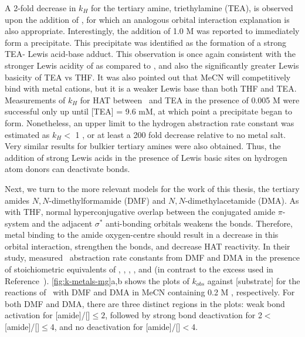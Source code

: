 \begin{doublespace}
A 2-fold decrease in $k_H$ for the tertiary amine, triethylamine (TEA), is
observed upon the addition of , for which an analogous orbital
interaction explanation is also appropriate. Interestingly, the addition of 1.0
M  was reported to immediately form a precipitate. This
precipitate was identified as the formation of a strong TEA- Lewis
acid-base adduct. This observation is once again consistent with the stronger
Lewis acidity of  as compared to , and also the
significantly greater Lewis basicity of TEA vs THF.\cite{Salamone2013a,
Reichardt2010} It was also pointed out that MeCN will competitively bind with
metal cations, but it is a weaker Lewis base than both THF and TEA.
Measurements of $k_H$ for HAT between \cumo\ and TEA in the presence of 0.005 M
 were successful only up until [TEA] = 9.6 mM, at which point a
precipitate began to form. Nonetheless, an upper limit to the hydrogen
abstraction rate constant was estimated as $k_H <$ 1 \Ms, or at least a 200
fold decrease relative to no metal salt. Very similar results for bulkier
tertiary amines were also obtained. Thus, the addition of strong Lewis acids in
the presence of Lewis basic sites on hydrogen atom donors can deactivate
 bonds.

Next, we turn to the more relevant models for the work of this thesis, the
tertiary amides $N,N$-dimethylformamide (DMF) and $N,N$-dimethylacetamide (DMA).
As with THF, normal hyperconjugative overlap between the conjugated amide
$\pi$-system and the adjacent  $\sigma^*$ anti-bonding orbitals weakens
the  bonds. Therefore, metal binding to the amide oxygen-centre should
result in a decrease in this orbital interaction, strengthen the  bonds,
and decrease HAT reactivity. In their study, \citet{Salamone2015metals} measured
\cumo\ abstraction rate constants from DMF and DMA in the presence of
stoichiometric equivalents of , , ,
, and  (in contrast to the excess used in
Reference~). \ref{fig:k-metals-mg}a,b shows the plots of
$k_{obs}$ against [substrate] for the reactions of \cumo\ with DMF and DMA in
MeCN containing 0.2 M , respectively. For both DMF and DMA, there
are three distinct regions in the plots: weak  bond activation for
[amide]/[]$\leq 2$, followed by strong  bond deactivation
for 2$<$[amide]/[]$\leq$4, and no deactivation for
[amide]/[]$<$4.


\end{doublespace}
